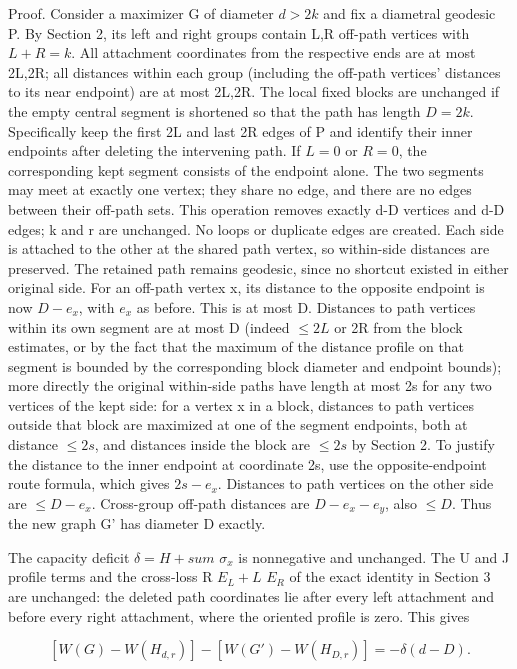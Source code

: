 \documentclass[
  11pt,
]{article}
\begin{document}
Proof. Consider a maximizer G of diameter \(d>2k\) and fix a diametral
geodesic P. By Section 2, its left and right groups contain L,R off-path
vertices with \(L+R=k\). All attachment coordinates from the respective
ends are at most 2L,2R; all distances within each group (including the
off-path vertices' distances to its near endpoint) are at most 2L,2R.
The local fixed blocks are unchanged if the empty central segment is
shortened so that the path has length \(D=2k\). Specifically keep the
first 2L and last 2R edges of P and identify their inner endpoints after
deleting the intervening path. If \(L=0\) or \(R=0\), the corresponding
kept segment consists of the endpoint alone. The two segments may meet
at exactly one vertex; they share no edge, and there are no edges
between their off-path sets. This operation removes exactly d-D vertices
and d-D edges; k and r are unchanged. No loops or duplicate edges are
created. Each side is attached to the other at the shared path vertex,
so within-side distances are preserved. The retained path remains
geodesic, since no shortcut existed in either original side. For an
off-path vertex x, its distance to the opposite endpoint is now
\(D-e_{x}\), with \(e_{x}\) as before. This is at most D. Distances to
path vertices within its own segment are at most D (indeed \(\le 2L\) or
2R from the block estimates, or by the fact that the maximum of the
distance profile on that segment is bounded by the corresponding block
diameter and endpoint bounds); more directly the original within-side
paths have length at most 2s for any two vertices of the kept side: for
a vertex x in a block, distances to path vertices outside that block are
maximized at one of the segment endpoints, both at distance \(\le 2s\),
and distances inside the block are \(\le 2s\) by Section 2. To justify
the distance to the inner endpoint at coordinate 2s, use the
opposite-endpoint route formula, which gives \(2s-e_{x}\). Distances to
path vertices on the other side are \(\le D-e_{x}\). Cross-group
off-path distances are \(D-e_{x}-e_{y}\), also \(\le D\). Thus the new
graph G' has diameter D exactly.

The capacity deficit \(\delta =H+sum\) \(\sigma _{x}\) is nonnegative
and unchanged. The U and J profile terms and the cross-loss R
\(E_{L}+L\) \(E_{R}\) of the exact identity in Section 3 are unchanged:
the deleted path coordinates lie after every left attachment and before
every right attachment, where the oriented profile is zero. This gives

\[[W(G)-W(H_{d,r})]-[W(G\prime)-W(H_{D,r})]=-\delta(d-D).\]
\end{document}
